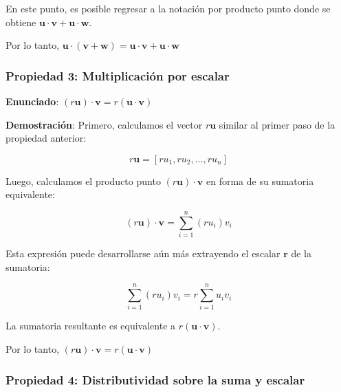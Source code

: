\documentclass[12 pt]{article}
\begin{document}
En este punto, es posible regresar a la notación por producto punto donde se obtiene \(\mathbf{u} \cdot \mathbf{v} + \mathbf{u} \cdot \mathbf{w}\).

\begin{center}
Por lo tanto, \(\mathbf{u} \cdot (\mathbf{v} + \mathbf{w}) = \mathbf{u} \cdot \mathbf{v} + \mathbf{u} \cdot \mathbf{w}\)\\
\end{center}


\subsubsection*{Propiedad 3: Multiplicación por escalar}

\begin{center}
\textbf{Enunciado}: \((r \mathbf{u}) \cdot \mathbf{v} = r (\mathbf{u} \cdot \mathbf{v})\)\\
\end{center}

\textbf{Demostración}: Primero, calculamos el vector \(r \mathbf{u}\) similar al primer paso de la propiedad anterior:

\[
r \mathbf{u} = [r u_1, r u_2, \dots, r u_n]
\]

Luego, calculamos el producto punto \((r \mathbf{u}) \cdot \mathbf{v}\) en forma de su sumatoria equivalente:

\[
(r \mathbf{u}) \cdot \mathbf{v} = \sum_{i=1}^{n} (r u_i) v_i
\]

Esta expresión puede desarrollarse aún más extrayendo el escalar \(\mathbf{r}\) de la sumatoria:

\[
\sum_{i=1}^{n} (r u_i) v_i = r \sum_{i=1}^{n} u_i v_i
\]

La sumatoria resultante es equivalente a \(r (\mathbf{u} \cdot \mathbf{v})\).

\begin{center}
Por lo tanto, \((r \mathbf{u}) \cdot \mathbf{v} = r (\mathbf{u} \cdot \mathbf{v})\)\\
\end{center}


\subsubsection*{Propiedad 4: Distributividad sobre la suma y escalar}
\end{document}
